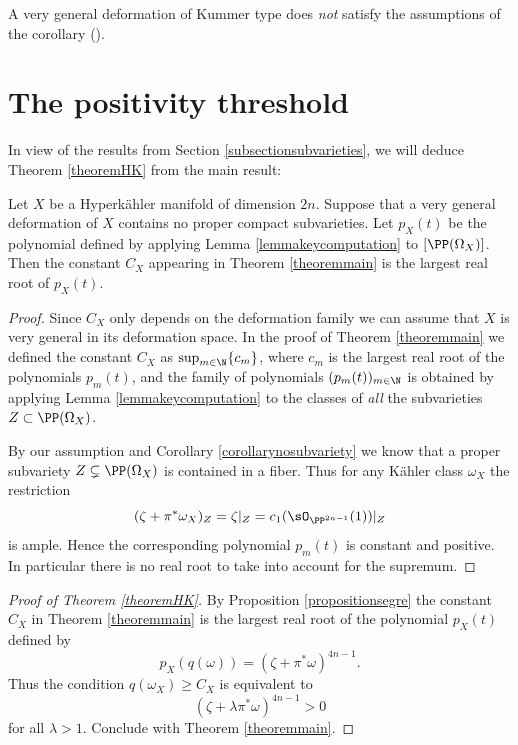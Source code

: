 \begin{remark} \label{remarknosubvarieties2}
A very general deformation of Kummer type
does {\em not} satisfy the assumptions of the corollary (\cite[\S 6.1]{KV98I}).
\end{remark}

\section{The positivity threshold}
\label{sectionpositivity}

In view of the results from Section \ref{subsectionsubvarieties}, we will deduce
Theorem \ref{theoremHK} from the main result:

\begin{proposition}\label{propositionsegre}
Let $X$ be a Hyperkähler manifold of dimension $2n$. Suppose that
a very general deformation of $X$ contains no proper compact subvarieties.
Let $p_X(t)$ be the polynomial defined by applying Lemma \ref{lemmakeycomputation}
to $[\PP(\Omega_X)]$.
Then the constant $C_X$ appearing in Theorem \ref{theoremmain}
is the largest real root of $p_X(t)$.
\end{proposition} 

\begin{proof}
Since $C_X$ only depends on the deformation family we can assume that $X$ is very general in its deformation space.
In the proof of Theorem \ref{theoremmain} we defined the constant $C_X$ as
$\sup_{m \in \N} \{ c_m \}$, where $c_m$ is the largest real root
of the polynomials $p_m(t)$,
and the family of polynomials $(p_m(t))_{m \in \N}$ is obtained by applying
Lemma \ref{lemmakeycomputation} to the classes of {\em all} the subvarieties $Z \subset \PP(\Omega_X)$.

By our assumption and Corollary \ref{corollarynosubvariety} we know that a proper subvariety $Z \subsetneq \PP(\Omega_X)$
is contained in a fiber. Thus for any Kähler class $\omega_X$ the restriction
\[
(\zeta+\pi^* \omega_X)_Z = \zeta|_Z = c_1(\sO_{\PP^{2n-1}}(1))|_Z
\]
is ample. Hence the corresponding polynomial $p_m(t)$ is constant and positive. In particular there is no real root to take into account for the supremum.
\end{proof}

\begin{proof}[Proof of Theorem \ref{theoremHK}]
By Proposition \ref{propositionsegre} the constant $C_X$ in Theorem \ref{theoremmain} is the largest real root
of the polynomial $p_X(t)$ defined by
\[
p_X(q(\omega)) = (\zeta + \pi^* \omega)^{4n-1}.
\]
Thus the condition $q(\omega_X) \geq C_X$ is equivalent to
\[
(\zeta + \lambda \pi^* \omega)^{4n-1} > 0
\]
for all $\lambda > 1$. Conclude with Theorem \ref{theoremmain}.
\end{proof}

